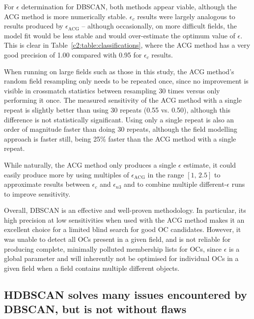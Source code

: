 For $\epsilon$ determination for DBSCAN, both methods appear viable, although the ACG method is more numerically stable. $\epsilon_{c}$ results were largely analogous to results produced by $\epsilon_{\text{ACG}}$ -- although occasionally, on more difficult fields, the model fit would be less stable and would over-estimate the optimum value of $\epsilon$. This is clear in Table~\ref{c2:table:classifications}, where the ACG method has a very good precision of 1.00 compared with 0.95 for $\epsilon_c$ results.

When running on large fields such as those in this study, the ACG method's random field resampling only needs to be repeated once, since no improvement is visible in crossmatch statistics between resampling 30 times versus only performing it once. The measured sensitivity of the ACG method with a single repeat is slightly better than using 30 repeats (0.55 vs. 0.50), although this difference is not statistically significant. Using only a single repeat is also an order of magnitude faster than doing 30 repeats, although the field modelling approach is faster still, being 25\% faster than the ACG method with a single repeat.

While naturally, the ACG method only produces a single $\epsilon$ estimate, it could easily produce more by using multiples of $\epsilon_{\text{ACG}}$ in the range $[1, \, 2.5]$ to approximate results between $\epsilon_c$ and $\epsilon_{n3}$ and to combine multiple different-$\epsilon$ runs to improve sensitivity. 

Overall, DBSCAN is an effective and well-proven methodology. In particular, its high precision at low sensitivities when used with the ACG method makes it an excellent choice for a limited blind search for good OC candidates. However, it was unable to detect all OCs present in a given field, and is not reliable for producing complete, minimally polluted membership lists for OCs, since $\epsilon$ is a global parameter and will inherently not be optimised for individual OCs in a given field when a field contains multiple different objects.


\subsection{HDBSCAN solves many issues encountered by DBSCAN, but is not without flaws}\label{c2:sec:discussion_hdbscan}


